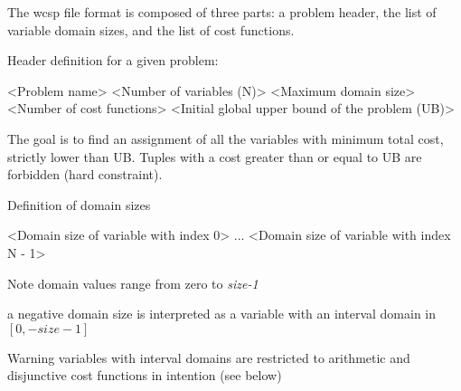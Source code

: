 \documentclass{article}
\begin{document}
The wcsp file format is composed of three parts\-: a problem header, the list of variable domain sizes, and the list of cost functions.


\begin{DoxyItemize}
\item Header definition for a given problem\-: \begin{DoxyVerb}<Problem name>
<Number of variables (N)>
<Maximum domain size>
<Number of cost functions>
<Initial global upper bound of the problem (UB)>
\end{DoxyVerb}
 The goal is to find an assignment of all the variables with minimum total cost, strictly lower than U\-B. Tuples with a cost greater than or equal to U\-B are forbidden (hard constraint).
\item Definition of domain sizes \begin{DoxyVerb}<Domain size of variable with index 0>
...
<Domain size of variable with index N - 1>
\end{DoxyVerb}
 \begin{DoxyNote}{Note}
domain values range from zero to {\itshape size-\/1} 

a negative domain size is interpreted as a variable with an interval domain in $[0,-size-1]$ 
\end{DoxyNote}
\begin{DoxyWarning}{Warning}
variables with interval domains are restricted to arithmetic and disjunctive cost functions in intention (see below)
\end{DoxyWarning}


\end{DoxyItemize}
\end{document}
